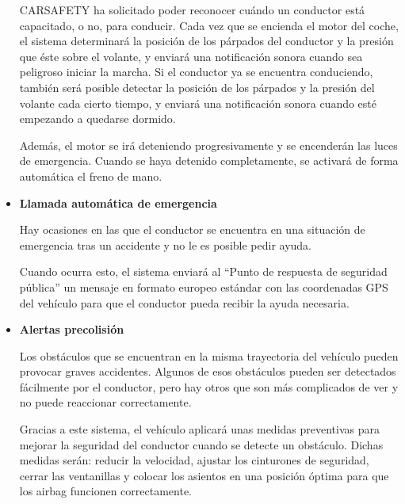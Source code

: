 \begin{itemize}[-]
\par CARSAFETY ha solicitado poder reconocer cuándo un conductor está capacitado, o no, para conducir. Cada vez que se encienda el motor del coche, el sistema determinará la posición de los párpados del conductor y la presión que éste sobre el volante, y enviará una notificación sonora cuando sea peligroso iniciar la marcha. Si el conductor ya se encuentra conduciendo, también será posible detectar la posición de los párpados y la presión del volante cada cierto tiempo, y enviará una notificación sonora cuando esté empezando a quedarse dormido.
\par Además, el motor se irá deteniendo progresivamente y se encenderán las luces de emergencia. Cuando se haya detenido completamente, se activará de forma automática el freno de mano.
\item \textbf{Llamada automática de emergencia}
\par Hay ocasiones en las que el conductor se encuentra en una situación de emergencia tras un accidente y no le es posible pedir ayuda.
\par Cuando ocurra esto, el sistema enviará al “Punto de respuesta de seguridad pública” un mensaje en formato europeo estándar con las coordenadas GPS del vehículo para que el conductor pueda recibir la ayuda necesaria.
\item \textbf{Alertas precolisión}
\par Los obstáculos que se encuentran en la misma trayectoria del vehículo pueden provocar graves accidentes. Algunos de esos obstáculos pueden ser detectados fácilmente por el conductor, pero hay otros que son más complicados de ver y no puede reaccionar correctamente.
\par Gracias a este sistema, el vehículo aplicará unas medidas preventivas para mejorar la seguridad del conductor cuando se detecte un obstáculo. Dichas medidas serán: reducir la velocidad, ajustar los cinturones de seguridad, cerrar las ventanillas y colocar los asientos en una posición óptima para que los airbag funcionen correctamente.
\end{itemize}

